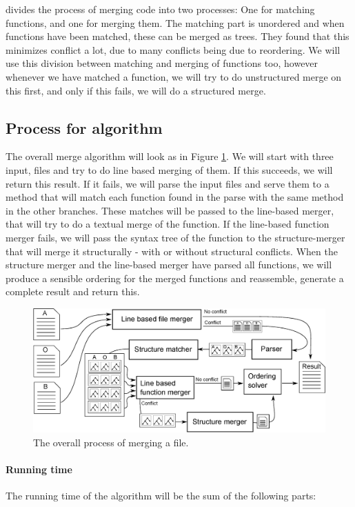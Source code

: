 \documentclass[11pt]{article}
\begin{document}
\citet{Apel} divides the process of merging code into two processes: One for matching functions, and one for merging them. The matching part is unordered and when functions have been matched, these can be merged as trees. They found that this minimizes conflict a lot, due to many conflicts being due to reordering. We will use this division between matching and merging of functions too, however whenever we have matched a function, we will try to do unstructured merge on this first, and only if this fails, we will do a structured merge.

\subsection{Process for algorithm}
The overall merge algorithm will look as in Figure \ref{OverallMergingProcess}. We will start with three input, files and try to do line based merging of them. If this succeeds, we will return this result. If it fails, we will parse the input files and serve them to a method that will match each function found in the parse with the same method in the other branches. These matches will be passed to the line-based merger, that will try to do a textual merge of the function. If the line-based function merger fails, we will pass the syntax tree of the function to the structure-merger that will merge it structurally - with or without structural conflicts. When the structure merger and the line-based merger have parsed all functions, we will produce a sensible ordering for the merged functions and reassemble, generate a complete result and return this.


\begin{figure}
   \centerline{\includegraphics[scale=0.55]{drawings/eps/overallmergingprocess.eps}}
   \caption{The overall process of merging a file.}
   \label{OverallMergingProcess}
\end{figure}


\paragraph{Running time} The running time of the algorithm will be the sum of the following parts:
\end{document}
